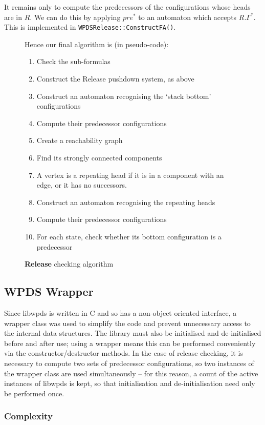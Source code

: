 \documentclass[11pt]{article}
\theoremstyle{definition}
\begin{document}
It remains only to compute the predecessors of the configurations whose heads
are in $R$. We can do this by applying $\textit{pre}^*$ to an automaton which
accepts $R.\Gamma^*$. This is implemented in \texttt{WPDSRelease::ConstructFA()}.

\begin{figure}[h!]
\caption{\textbf{Release} checking algorithm}
Hence our final algorithm is (in pseudo-code):
\begin{enumerate}
\item{Check the sub-formulas}
\item{Construct the Release pushdown system, as above}
\item{Construct an automaton recognising the `stack bottom' configurations}
\item{Compute their predecessor configurations}
\item{Create a reachability graph}
\item{Find its strongly connected components}
\item{A vertex is a repeating head if it is in a component with an edge, or it has no successors.}
\item{Construct an automaton recognising the repeating heads}
\item{Compute their predecessor configurations}
\item{For each state, check whether its bottom configuration is a predecessor}
\end{enumerate}
\end{figure}

\subsection{WPDS Wrapper}

Since libwpds is written in C and so has a non-object oriented interface, a
wrapper class was used to simplify the code and prevent unnecessary access to
the internal data structures. The library must also be initialised and
de-initialised before and after use; using a wrapper means this can be
performed conveniently via the constructor/destructor methods. In the case of
release checking, it is necessary to compute two sets of predecessor
configurations, so two instances of the wrapper class are used simultaneously
-- for this reason, a count of the active instances of libwpds is kept, so that
initialisation and de-initialisation need only be performed once.

\subsubsection{Complexity}
\end{document}

